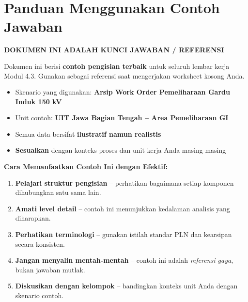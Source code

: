 \documentclass[12pt,a4paper]{report}
\begin{document}
\newpage
\thispagestyle{fancy}

\section*{\color{plnblue}Panduan Menggunakan Contoh Jawaban}

\begin{contohbox}
\begin{center}
\textbf{DOKUMEN INI ADALAH KUNCI JAWABAN / REFERENSI}
\end{center}
Dokumen ini berisi \textbf{contoh pengisian terbaik} untuk seluruh lembar kerja Modul 4.3. Gunakan sebagai referensi saat mengerjakan worksheet kosong Anda.

\begin{itemize}
    \item Skenario yang digunakan: \textbf{Arsip Work Order Pemeliharaan Gardu Induk 150 kV}
    \item Unit contoh: \textbf{UIT Jawa Bagian Tengah -- Area Pemeliharaan GI}
    \item Semua data bersifat \textbf{ilustratif namun realistis}
    \item \textbf{Sesuaikan} dengan konteks proses dan unit kerja Anda masing-masing
\end{itemize}
\end{contohbox}

\vspace{0.4cm}

\begin{instruksibox}
\textbf{Cara Memanfaatkan Contoh Ini dengan Efektif:}
\begin{enumerate}
    \item \textbf{Pelajari struktur pengisian} -- perhatikan bagaimana setiap komponen dihubungkan satu sama lain.
    \item \textbf{Amati level detail} -- contoh ini menunjukkan kedalaman analisis yang diharapkan.
    \item \textbf{Perhatikan terminologi} -- gunakan istilah standar PLN dan kearsipan secara konsisten.
    \item \textbf{Jangan menyalin mentah-mentah} -- contoh ini adalah \textit{referensi gaya}, bukan jawaban mutlak.
    \item \textbf{Diskusikan dengan kelompok} -- bandingkan konteks unit Anda dengan skenario contoh.
\end{enumerate}
\end{instruksibox}
\end{document}
